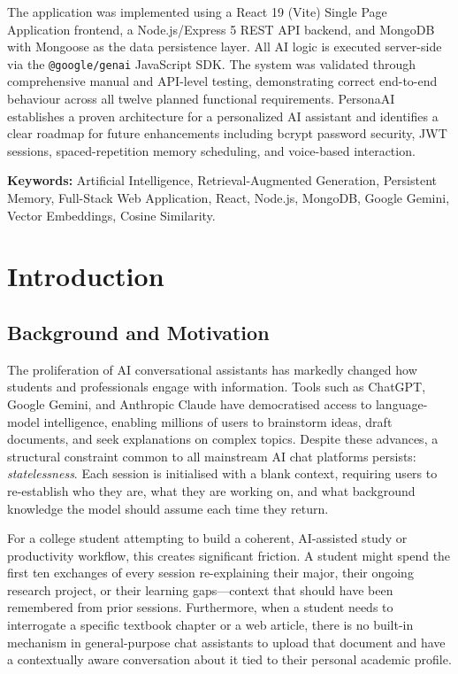 \documentclass[12pt,a4paper]{report}
\begin{document}
The application was implemented using a React 19 (Vite) Single Page Application frontend, a Node.js/Express 5 REST API backend, and MongoDB with Mongoose as the data persistence layer. All AI logic is executed server-side via the \texttt{@google/genai} JavaScript SDK. The system was validated through comprehensive manual and API-level testing, demonstrating correct end-to-end behaviour across all twelve planned functional requirements. PersonaAI establishes a proven architecture for a personalized AI assistant and identifies a clear roadmap for future enhancements including bcrypt password security, JWT sessions, spaced-repetition memory scheduling, and voice-based interaction.

\vspace{0.5cm}
\textbf{Keywords:} Artificial Intelligence, Retrieval-Augmented Generation, Persistent Memory, Full-Stack Web Application, React, Node.js, MongoDB, Google Gemini, Vector Embeddings, Cosine Similarity.

\cleardoublepage

\tableofcontents
\cleardoublepage
{}

\chapter{Introduction}

\section{Background and Motivation}

The proliferation of AI conversational assistants has markedly changed how students and professionals engage with information. Tools such as ChatGPT, Google Gemini, and Anthropic Claude have democratised access to language-model intelligence, enabling millions of users to brainstorm ideas, draft documents, and seek explanations on complex topics. Despite these advances, a structural constraint common to all mainstream AI chat platforms persists: \textit{statelessness}. Each session is initialised with a blank context, requiring users to re-establish who they are, what they are working on, and what background knowledge the model should assume each time they return.

For a college student attempting to build a coherent, AI-assisted study or productivity workflow, this creates significant friction. A student might spend the first ten exchanges of every session re-explaining their major, their ongoing research project, or their learning gaps—context that should have been remembered from prior sessions. Furthermore, when a student needs to interrogate a specific textbook chapter or a web article, there is no built-in mechanism in general-purpose chat assistants to upload that document and have a contextually aware conversation about it tied to their personal academic profile.
\end{document}
